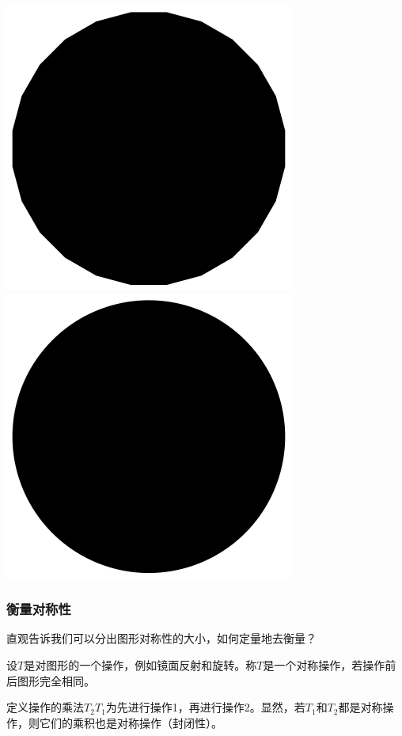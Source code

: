 \documentclass[CJK]{beamer}
\begin{document}
\begin{frame}
\begin{center}
\includegraphics[scale=0.15]{pol24}
\includegraphics[scale=0.15]{cir}
\end{center}

\ech
\end{frame}

\begin{frame}
\frametitle{\bch 衡量对称性 \ech}
\bch
直观告诉我们可以分出图形对称性的大小，如何定量地去衡量？
\par
设$T$是对图形的一个操作，例如镜面反射和旋转。称$T$是一个对称操作，若操作前后图形完全相同。
\par
定义操作的乘法$T_2 T_1$为先进行操作1，再进行操作2。显然，若$T_1$和$T_2$都是对称操作，则它们的乘积也是对称操作（封闭性）。


\ech
\end{frame}
\end{document}
